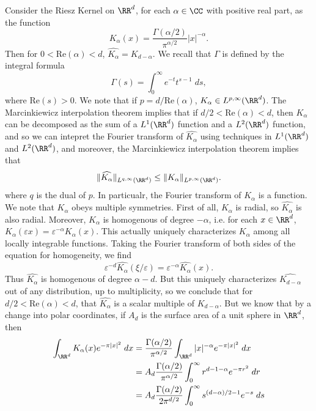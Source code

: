 \begin{example}
  Consider the Riesz Kernel on $\RR^d$, for each $\alpha \in \CC$ with positive real part, as the function
  \[ K_\alpha(x) = \frac{\Gamma(\alpha/2)}{\pi^{\alpha/2}} |x|^{-\alpha}. \]
  Then for $0 < \text{Re}(\alpha) < d$, $\widehat{K_\alpha} = K_{d-\alpha}$. We recall that $\Gamma$ is defined by the integral formula
  \[ \Gamma(s) = \int_0^\infty e^{-t} t^{s-1}\; ds, \]
  where $\text{Re}(s) > 0$. We note that if $p = d/\text{Re}(\alpha)$, $K_\alpha \in L^{p,\infty}(\RR^d)$. The Marcinkiewicz interpolation theorem implies that if $d/2 < \text{Re}(\alpha) < d$, then $K_\alpha$ can be decomposed as the sum of a $L^1(\RR^d)$ function and a $L^2(\RR^d)$ function, and so we can intepret the Fourier transform of $\widehat{K_\alpha}$ using techniques in $L^1(\RR^d)$ and $L^2(\RR^d)$, and moreover, the Marcinkiewicz interpolation theorem implies that
  \[ \| \widehat{K_\alpha} \|_{L^{q,\infty}(\RR^d)} \leq \| K_\alpha \|_{L^{p,\infty}(\RR^d)}. \]
  where $q$ is the dual of $p$. In particualr, the Fourier transform of $K_\alpha$ is a function. We note that $K_\alpha$ obeys multiple symmetries. First of all, $K_\alpha$ is radial, so $\widehat{K_\alpha}$ is also radial. Moreover, $K_\alpha$ is homogenous of degree $-\alpha$, i.e. for each $x \in \RR^d$, $K_\alpha(\varepsilon x) = \varepsilon^{-\alpha} K_\alpha(x)$. This actually uniquely characterizes $K_\alpha$ among all locally integrable functions. Taking the Fourier transform of both sides of the equation for homogeneity, we find
  \[ \varepsilon^{-d} \widehat{K_\alpha}(\xi/\varepsilon) = \varepsilon^{-\alpha} \widehat{K_\alpha}(x). \]
  Thus $\widehat{K_\alpha}$ is homogenous of degree $\alpha - d$. But this uniquely characterizes $\widehat{K_{d-\alpha}}$ out of any distribution, up to multiplicity, so we conclude that for $d/2 < \text{Re}(\alpha) < d$, that $\widehat{K_\alpha}$ is a scalar multiple of $K_{d-\alpha}$. But we know that by a change into polar coordinates, if $A_d$ is the surface area of a unit sphere in $\RR^d$, then
  \begin{align*}
    \int_{\RR^d} K_\alpha(x) e^{- \pi |x|^2}\; dx &= \frac{\Gamma(\alpha/2)}{\pi^{\alpha/2}} \int_{\RR^d} |x|^{-\alpha} e^{-\pi |x|^2}\; dx\\
    &= A_d \frac{\Gamma(\alpha/2)}{\pi^{\alpha/2}} \int_0^\infty r^{d-1-\alpha} e^{- \pi r^2}\; dr\\
    &= A_d \frac{\Gamma(\alpha/2)}{2 \pi^{d/2}} \int_0^\infty s^{(d-\alpha)/2 - 1} e^{-s}\; ds\\

\end{align*}
\end{example}
